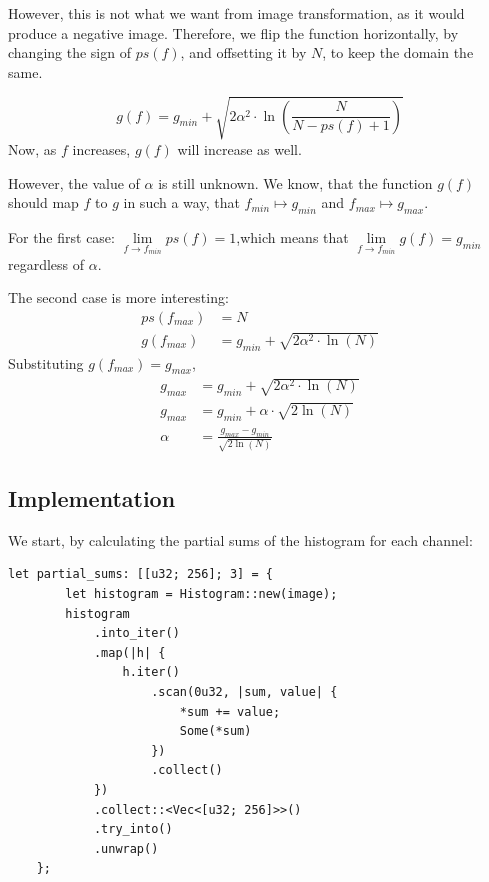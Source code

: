 \documentclass[12pt]{article}
\begin{document}
However, this is not what we want from image transformation, as it would produce a negative image.
Therefore, we flip the function horizontally, by changing the sign of $ps(f)$, and offsetting it by $N$, to keep the domain the same.

\begin{equation}
    g(f) = g_{min} + \sqrt{
        2 \alpha^2 \cdot \ln
        \left(
        \frac{N}{N - ps(f) + 1}
        \right)}
    \label{eq:rayleigh-corrected}
\end{equation}
Now, as $f$ increases, $g(f)$ will increase as well.

However, the value of $\alpha$ is still unknown.
We know, that the function $g(f)$ should map $f$ to $g$ in such a way, that
$f_{min} \mapsto g_{min}$ and $f_{max} \mapsto g_{max}$.

For the first case:
\(
\lim\limits_{f \to f_{min}} ps(f) = 1
\),which means that
\(
\lim\limits_{f \to f_{min}} g(f) = g_{min}
\) regardless of $\alpha$.

The second case is more interesting:
\begin{align*}
    ps(f_{max}) & = N                \\[1ex]
    g(f_{max})  & = g_{min} + \sqrt{
        2 \alpha^2 \cdot \ln(N)
    }
\end{align*}
Substituting $g(f_{max}) = g_{max}$,
\begin{align}
    g_{max} & = g_{min} + \sqrt{
        2 \alpha^2 \cdot \ln(N)
    }\nonumber                                                                     \\[1ex]
    g_{max} & = g_{min} + \alpha \cdot \sqrt{2\ln(N)} \nonumber                    \\[1ex]
    \alpha  & = \frac{g_{max} - g_{min}}{\sqrt{2\ln(N)}} \label{eq:rayleigh-alpha}
\end{align}

\subsection{Implementation}

We start, by calculating the partial sums of the histogram for each channel:
\begin{lstlisting}
let partial_sums: [[u32; 256]; 3] = {
        let histogram = Histogram::new(image);
        histogram
            .into_iter()
            .map(|h| {
                h.iter()
                    .scan(0u32, |sum, value| {
                        *sum += value;
                        Some(*sum)
                    })
                    .collect()
            })
            .collect::<Vec<[u32; 256]>>()
            .try_into()
            .unwrap()
    };
\end{lstlisting}
\end{document}
